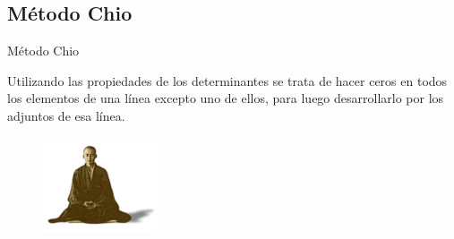 \vspace{-4mm}%
\subsection{Método Chio}
\vspace{-2mm}%

\begin{myblock}{Método Chio}
\begin{multicols}{2}
\small{Utilizando las propiedades de los determinantes se trata de hacer ceros en todos los elementos de una línea excepto uno de ellos, para luego desarrollarlo por los adjuntos de esa línea}\normalsize{}.

\begin{figure}[H]
	\centering
	\includegraphics[width=0.3\textwidth]{imagenes/imagenes04/T04IM01.png}
\end{figure}
\end{multicols}
\end{myblock}

